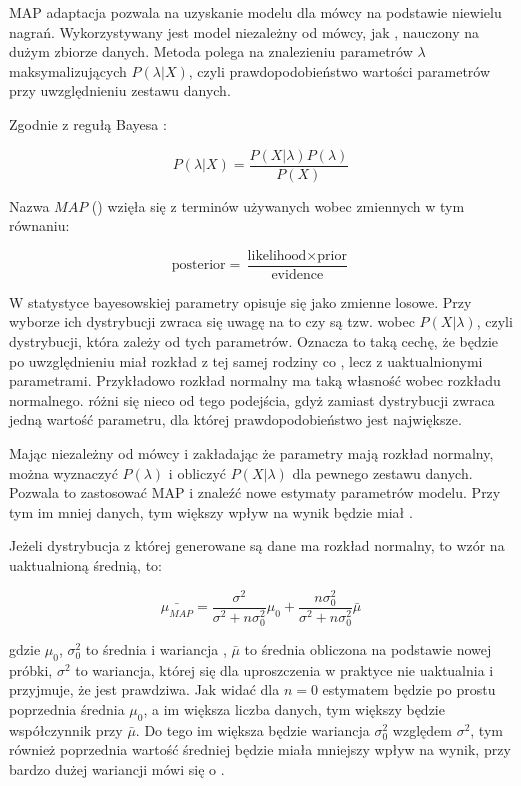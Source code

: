 MAP adaptacja pozwala na uzyskanie modelu dla mówcy na podstawie niewielu nagrań. Wykorzystywany jest model niezależny 
od mówcy, jak , nauczony na dużym zbiorze danych. Metoda polega na znalezieniu parametrów $\lambda$ 
maksymalizujących $P(\lambda | X)$, czyli prawdopodobieństwo wartości parametrów przy uwzględnieniu zestawu danych.

Zgodnie z regułą Bayesa :

$$P(\lambda | X) = \frac{P(X | \lambda) P(\lambda)}{P(X)}$$

Nazwa $MAP$ () wzięła się z terminów używanych wobec zmiennych w tym równaniu:

$$\text{posterior} = \frac{\text{likelihood} \times \text{prior}}{\text{evidence}}$$

W statystyce bayesowskiej parametry opisuje się jako zmienne losowe. Przy wyborze ich dystrybucji zwraca się uwagę
na to czy są tzw.  wobec $P(X | \lambda)$, czyli dystrybucji, która zależy od tych parametrów.
Oznacza to taką cechę, że  będzie po uwzględnieniu  miał rozkład z tej samej
rodziny co , lecz z uaktualnionymi parametrami. Przykładowo rozkład normalny ma taką własność wobec
rozkładu normalnego.   różni się nieco od tego podejścia, gdyż zamiast dystrybucji zwraca jedną 
wartość parametru, dla której prawdopodobieństwo jest największe.

Mając  niezależny od mówcy i zakładając że parametry mają rozkład normalny, można wyznaczyć
$P(\lambda)$ i obliczyć $P(X | \lambda)$ dla pewnego zestawu danych. Pozwala to zastosować MAP i znaleźć nowe
estymaty parametrów modelu. Przy tym im mniej danych, tym większy wpływ na wynik będzie miał .

Jeżeli dystrybucja z której generowane są dane ma rozkład normalny, to wzór na uaktualnioną średnią, to:

$$\bar{\mu_{MAP}} = \frac{\sigma^2}{\sigma^2 + n \sigma_0^2} \mu_0 + \frac{n \sigma^2_0}{\sigma^2 + n \sigma_0^2} \bar{\mu}$$

gdzie $\mu_0$, $\sigma_0^2$ to średnia i wariancja , $\bar{\mu}$ to średnia obliczona na podstawie nowej próbki, $\sigma^2$ to wariancja, której się dla uproszczenia w praktyce nie uaktualnia i przyjmuje, że jest prawdziwa. Jak widać
dla $n = 0$  estymatem będzie po prostu poprzednia średnia $\mu_0$, a im większa liczba danych, tym
większy będzie współczynnik przy $\bar{\mu}$. Do tego im większa będzie wariancja  $\sigma_0^2$ względem
$\sigma^2$, tym również poprzednia wartość średniej będzie miała mniejszy wpływ na wynik, przy bardzo dużej wariancji
mówi się o \cite{fundamentalsOfSpeech}.

